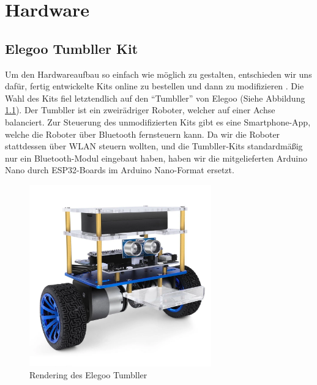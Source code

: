 \chapter{Hardware}
\label{sec:hardware}
\section{Elegoo Tumbller Kit}
\label{subsec:elegoo_tumbller}
Um den Hardwareaufbau so einfach wie möglich zu gestalten,
entschieden wir uns dafür,
fertig entwickelte Kits online zu bestellen und dann zu modifizieren \cite{elegoo-tumbller}.
%
Die Wahl des Kits fiel letztendlich auf den ``Tumbller'' von Elegoo (Siehe Abbildung \ref{fig:elegoo_tumbller}).
%
Der Tumbller ist ein zweirädriger Roboter, welcher auf einer Achse balanciert.
%
Zur Steuerung des unmodifizierten Kits gibt es eine Smartphone-App,
welche die Roboter über Bluetooth fernsteuern kann.
%
Da wir die Roboter stattdessen über WLAN steuern wollten, 
und die Tumbller-Kits standardmäßig nur ein Bluetooth-Modul eingebaut haben,
haben wir die mitgelieferten Arduino Nano durch ESP32-Boards im Arduino Nano-Format ersetzt.
\begin{figure}[H]
    \includegraphics[width=0.7\textwidth, center]{img/elegoo_tumbller.png}
    \caption{Rendering des Elegoo Tumbller}
    \label{fig:elegoo_tumbller}
\end{figure}

